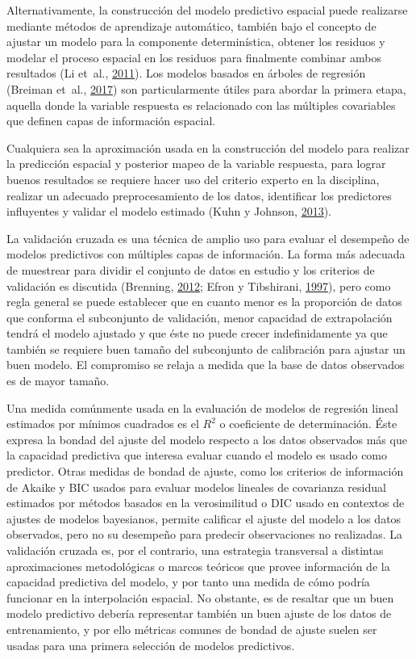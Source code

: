 \documentclass[11pt,b5paper,]{krantz}
\begin{document}
Alternativamente, la construcción del modelo predictivo espacial puede realizarse mediante métodos de aprendizaje automático, también bajo el concepto de ajustar un modelo para la componente determinística, obtener los residuos y modelar el proceso espacial en los residuos para finalmente combinar ambos resultados (Li et~al., \protect\hyperlink{ref-Li_Heap_Potter_Daniell_2011}{2011}). Los modelos basados en árboles de regresión (Breiman et~al., \protect\hyperlink{ref-Breiman_Friedman_Olshen_Stone_2017}{2017}) son particularmente útiles para abordar la primera etapa, aquella donde la variable respuesta es relacionado con las múltiples covariables que definen capas de información espacial.

Cualquiera sea la aproximación usada en la construcción del modelo para realizar la predicción espacial y posterior mapeo de la variable respuesta, para lograr buenos resultados se requiere hacer uso del criterio experto en la disciplina, realizar un adecuado preprocesamiento de los datos, identificar los predictores influyentes y validar el modelo estimado (Kuhn y Johnson, \protect\hyperlink{ref-Kuhn_Johnson_2013}{2013}).

La validación cruzada es una técnica de amplio uso para evaluar el desempeño de modelos predictivos con múltiples capas de información. La forma más adecuada de muestrear para dividir el conjunto de datos en estudio y los criterios de validación es discutida (Brenning, \protect\hyperlink{ref-Brenning_2012}{2012}; Efron y Tibshirani, \protect\hyperlink{ref-Efron_Tibshirani_1997}{1997}), pero como regla general se puede establecer que en cuanto menor es la proporción de datos que conforma el subconjunto de validación, menor capacidad de extrapolación tendrá el modelo ajustado y que éste no puede crecer indefinidamente ya que también se requiere buen tamaño del subconjunto de calibración para ajustar un buen modelo. El compromiso se relaja a medida que la base de datos observados es de mayor tamaño.

Una medida comúnmente usada en la evaluación de modelos de regresión lineal estimados por mínimos cuadrados es el \(R^2\) o coeficiente de determinación. Éste expresa la bondad del ajuste del modelo respecto a los datos observados más que la capacidad predictiva que interesa evaluar cuando el modelo es usado como predictor. Otras medidas de bondad de ajuste, como los criterios de información de Akaike y BIC usados para evaluar modelos lineales de covarianza residual estimados por métodos basados en la verosimilitud o DIC usado en contextos de ajustes de modelos bayesianos, permite calificar el ajuste del modelo a los datos observados, pero no su desempeño para predecir observaciones no realizadas. La validación cruzada es, por el contrario, una estrategia transversal a distintas aproximaciones metodológicas o marcos teóricos que provee información de la capacidad predictiva del modelo, y por tanto una medida de cómo podría funcionar en la interpolación espacial. No obstante, es de resaltar que un buen modelo predictivo debería representar también un buen ajuste de los datos de entrenamiento, y por ello métricas comunes de bondad de ajuste suelen ser usadas para una primera selección de modelos predictivos.
\end{document}
